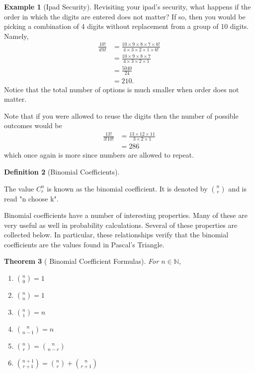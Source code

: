 \documentclass[10pt,]{book}
\theoremstyle{plain}
\newtheorem{theorem}{Theorem}[section]
\theoremstyle{definition}
\newtheorem{definition}[theorem]{Definition}
\theoremstyle{definition}
\newtheorem{example}[theorem]{Example}
\theoremstyle{definition}
\numberwithin{equation}{section}
\begin{document}
\begin{example}[Ipad Security]\label{example-9}
Revisiting your ipad's security, what happens if the order in which the digits are entered does not matter? If so, then you would be picking a combination of 4 digits without replacement from a group of 10 digits. Namely, 
		\begin{align*}
\frac{10!}{4!6!} & = \frac{10 \times 9 \times 8 \times 7 \times 6!}{4 \times 3 \times 2 \times 1 \times 6!}\\
& = \frac{10 \times 9 \times 8 \times 7}{4 \times 3 \times 2 \times 1}\\
& = \frac{5040}{24}\\
& = 210.
\end{align*}
		Notice that the total number of options is much smaller when order does not matter.
\par

		Note that if you were allowed to reuse the digits then the number of possible outcomes would be
		\begin{align*}
\frac{13!}{3!10!} & = \frac{13 \times 12 \times 11}{3 \times 2 \times 1} \\
 & = 286
\end{align*}
		which once again is more since numbers are allowed to repeat.
\end{example}
\begin{definition}[{Binomial Coefficients}]\label{definition-16}

		The value \(C_r^n\) is known as the binomial coefficient. It is
		denoted by \({n \choose r}\) and is read "n choose k".
\end{definition}
\par
Binomial coefficients have a number of interesting properties.  Many of these are very useful as well in probability calculations.  Several of these properties are collected below. In particular, these relationships verify that the binomial coefficients are the values found in Pascal's Triangle.%
\begin{theorem}[{ Binomial Coefficient Formulas}]\label{theorem-10}
 For \( n \in \mathbb{N}\),
	\leavevmode%
\begin{enumerate}
\item\hypertarget{li-74}{}\(\binom{n}{0} = 1\)%
\item\hypertarget{li-75}{}\(\binom{n}{n} = 1\)%
\item\hypertarget{li-76}{}\(\binom{n}{1} = n\)%
\item\hypertarget{li-77}{}\(\binom{n}{n-1} = n\)%
\item\hypertarget{li-78}{}\(\binom{n}{r} = \binom{n}{n-r}\)%
\item\hypertarget{li-79}{}\(\binom{n+1}{r+1} = \binom{n}{r} + \binom{n}{r+1}\)%
\end{enumerate}

\end{theorem}
\end{document}
